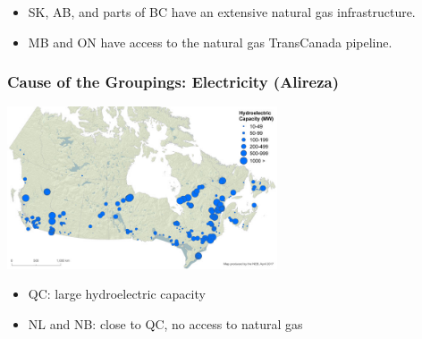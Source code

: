 \documentclass{beamer}
\begin{document}
\begin{frame}




\small
\begin{itemize}
	\item SK, AB, and parts of BC have an extensive natural gas infrastructure.
	\item MB and ON have access to the natural gas TransCanada pipeline.
\end{itemize}
\normalsize
\end{frame}


\begin{frame}
\frametitle{Cause of the Groupings: Electricity (Alireza)}
\begin{center}
\includegraphics[width=0.6\textwidth]{hydroPower.jpg}
\small
\end{center}
\begin{itemize}
	\item QC: large hydroelectric capacity
	\item  NL and NB: close to QC, no access to natural gas  
\end{itemize}
\normalsize
\end{frame}
\end{document}
